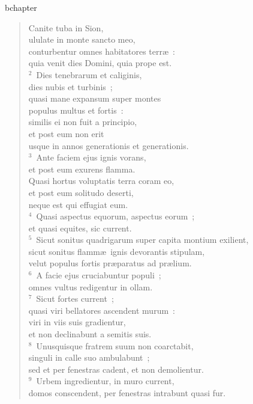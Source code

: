 bchapter\begin{flushleft}\begin{verse}\vspace{-19pt}Canite tuba in Sion,\\ ululate in monte sancto meo,\\ conturbentur omnes habitatores terr\ae~:\\ quia venit dies Domini, quia prope est.\\
${}^{2}$~Dies tenebrarum et caliginis,\\ dies nubis et turbinis~;\\ quasi mane expansum super montes\\ populus multus et fortis~:\\ similis ei non fuit a principio,\\ et post eum non erit\\ usque in annos generationis et generationis.\\
${}^{3}$~Ante faciem ejus ignis vorans,\\ et post eum exurens flamma.\\ Quasi hortus voluptatis terra coram eo,\\ et post eum solitudo deserti,\\ neque est qui effugiat eum.\\
${}^{4}$~Quasi aspectus equorum, aspectus eorum~;\\ et quasi equites, sic current.\\
${}^{5}$~Sicut sonitus quadrigarum super capita montium exilient,\\ sicut sonitus flamm\ae\ ignis devorantis stipulam,\\ velut populus fortis pr\ae paratus ad pr\ae lium.\\
${}^{6}$~A facie ejus cruciabuntur populi~;\\ omnes vultus redigentur in ollam.\\
${}^{7}$~Sicut fortes current~;\\ quasi viri bellatores ascendent murum~:\\ viri in viis suis gradientur,\\ et non declinabunt a semitis suis.\\
${}^{8}$~Unusquisque fratrem suum non coarctabit,\\ singuli in calle suo ambulabunt~;\\ sed et per fenestras cadent, et non demolientur.\\
${}^{9}$~Urbem ingredientur, in muro current,\\ domos conscendent, per fenestras intrabunt quasi fur.\\

\end{verse}
\end{flushleft}

